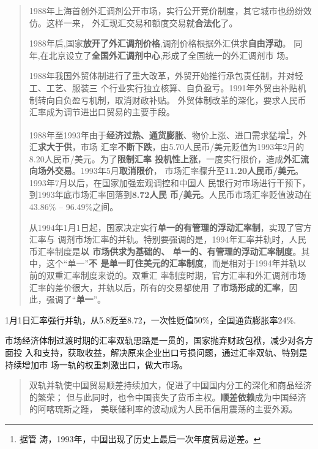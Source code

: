 \begin{quotation}
1988年上海首创外汇调剂公开市场，实行公开竞价制度，其它城市也纷纷效仿。这样一来，
外汇现汇交易和额度交易就\textbf{合法化}了。

1988年后,国家\textbf{放开了外汇调剂价格},调剂价格根据外汇供求\textbf{自由浮动}。
同年,在北京设立了\textbf{全国外汇调剂中心},形成了全国统一的外汇调剂市
场。\cite{wangqiangshehui}

1988年我国外贸体制进行了重大改革，外贸开始推行承包责任制，并对轻工、工艺、服装三
个行业实行独立核算、自负盈亏。1991年外贸由补贴机制转向自负盈亏机制，取消财政补贴。
外贸体制改革的深化，要求人民币汇率成为调节进出口贸易的主要手段。

1988年至1993年由于\textbf{经济过热、通货膨胀}、物价上涨、进口需求猛增\footnote{据管
  涛，1993年，中国出现了历史上最后一次年度贸易逆差。}，外汇\textbf{求大于供}，市场
汇率\textbf{不断下跌}，由5.70人民币/美元贬值为1993年2月的8.20人民币/美元。为了\textbf{限制汇率
  投机性上涨}，一度实行限价，造成\textbf{外汇流向场外交易}。1993年5月\textbf{取消限价}，
市场汇率骤升至\textbf{11.20人民币/美元}。1993年7月以后，在国家加强宏观调控和中国人
民银行对市场进行干预下，到1993年底市场汇率回落到\textbf{8.72人民
  币/美元}。\cite{huilvshi}人民币市场汇率贬值波动在 43.86\% -- 96.49\%之间。

从1994年1月1日起，国家决定实行\textbf{单一的有管理的浮动汇率制}，实现了官方汇率与
调剂市场汇率的并轨。特别要强调的是，1994年汇率并轨时，人民币汇率制度是\textbf{以
  市场供求为基础的、 单一的、有管理的浮动汇率制度}。其中，这个“单一”\textbf{不
  是单一盯住美元的汇率制度}，而是相对于1994年并轨以前的双重汇率制度来说的。双重汇
率制度时期，官方汇率和外汇调剂市场汇率的差价很大，并轨以后，所有的交易都使用
了\textbf{市场形成的汇率}，因此，强调了“\textbf{单一}”。\cite{guantaohuigai}
\end{quotation}

1月1日汇率强行并轨，从5.8贬至8.72，一次性贬值50\%，全国通货膨胀率24\%.

市场经济体制过渡时期的汇率双轨思路是一贯的，国家抛弃财政包袱，减少对各方面投
入和支持，获取收益，解决原来企业出口亏损问题，通过汇率双轨、特别是持续增加市
场一轨的权重刺激出口，做大市场。

\begin{quotation}
  双轨并轨使中国贸易顺差持续加大，促进了中国国内分工的深化和商品经济的繁荣；
  但与此同时，也令中国丧失了货币主权。\textbf{顺差依赖}成为中国经济的阿喀琉斯之踵，
  美联储利率的波动成为人民币信用震荡的主要外源。\cite{dajueqi}
\end{quotation}

